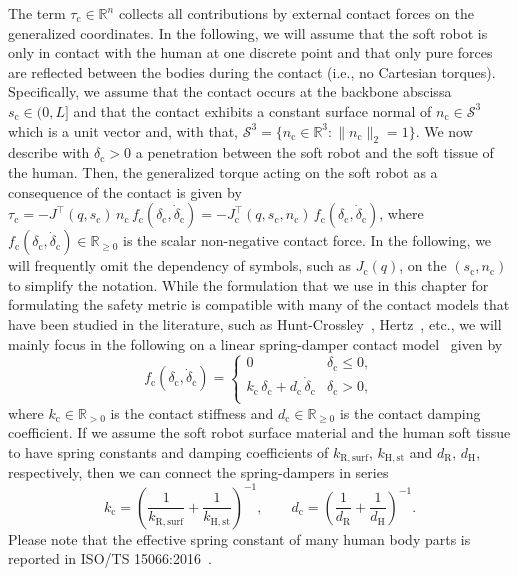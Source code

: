 The term $\tau_\mathrm{c} \in \mathbb{R}^n$ collects all contributions by external contact forces on the generalized coordinates.
In the following, we will assume that the soft robot is only in contact with the human at one discrete point and that only pure forces are reflected between the bodies during the contact (i.e., no Cartesian torques).
Specifically, we assume that the contact occurs at the backbone abscissa $s_\mathrm{c} \in (0, L]$ and that the contact exhibits a constant surface normal of $n_\mathrm{c} \in \mathcal{S}^3$ which is a unit vector and, with that, $\mathcal{S}^3 = \{ n_\mathrm{c} \in \mathbb{R}^3: \lVert n_\mathrm{c} \rVert_2 = 1 \}$.
We now describe with $\delta_\mathrm{c} > 0$ a penetration between the soft robot and the soft tissue of the human.
Then, the generalized torque acting on the soft robot as a consequence of the contact is given by $\tau_\mathrm{c} = -J^\top(q,s_\mathrm{c}) \, n_\mathrm{c} \, f_\mathrm{c}(\delta_\mathrm{c}, \dot{\delta}_\mathrm{c}) = -J_\mathrm{c}^\top(q, s_\mathrm{c}, n_\mathrm{c}) \, f_\mathrm{c}(\delta_\mathrm{c}, \dot{\delta}_\mathrm{c})$, where $f_\mathrm{c}(\delta_\mathrm{c}, \dot{\delta}_\mathrm{c}) \in \mathbb{R}_{\geq 0}$ is the scalar non-negative contact force.
In the following, we will frequently omit the dependency of symbols, such as $J_\mathrm{c}(q)$, on the $(s_\mathrm{c}, n_\mathrm{c})$ to simplify the notation.
While the formulation that we use in this chapter for formulating the safety metric is compatible with many of the contact models that have been studied in the literature, such as Hunt-Crossley~\citep{hunt1975coefficient, aouaj2021predicting}, Hertz~\citep{johnson1987contact, park2011designing, she2020comparative}, etc., we will mainly focus in the following on a linear spring-damper contact model~\citep{iso2016collaborative, haddadin2009requirements} given by
\begin{equation}
    f_\mathrm{c}(\delta_\mathrm{c}, \dot{\delta}_\mathrm{c}) =
    \begin{cases}
        0 & \delta_\mathrm{c} \leq 0,\\
        k_\mathrm{c} \, \delta_\mathrm{c} + d_\mathrm{c} \, \dot{\delta}_\mathrm{c} & \delta_\mathrm{c} > 0,\\
    \end{cases}
\end{equation}
where $k_\mathrm{c} \in \mathbb{R}_{>0}$ is the contact stiffness and $d_\mathrm{c} \in \mathbb{R}_{\geq 0}$ is the contact damping coefficient.
If we assume the soft robot surface material and the human soft tissue to have spring constants and damping coefficients of $k_\mathrm{R,surf}$, $k_\mathrm{H,st}$ and $d_\mathrm{R}$, $d_\mathrm{H}$, respectively, then we can connect the spring-dampers in series
\begin{equation}
    k_\mathrm{c} = \left (\frac{1}{k_\mathrm{R,surf}} + \frac{1}{k_\mathrm{H,st}} \right )^{-1},
    \qquad
    d_\mathrm{c} = \left (\frac{1}{d_\mathrm{R}} + \frac{1}{d_\mathrm{H}} \right )^{-1}.
\end{equation}
Please note that the effective spring constant of many human body parts is reported in ISO/TS 15066:2016~\citep{iso2016collaborative}.

